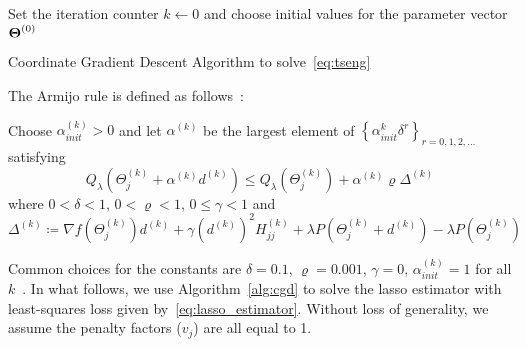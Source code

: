 \begin{algorithm}[htbp]
	\SetAlgoLined
	Set the iteration counter $k \leftarrow 0$ and choose initial values for the parameter vector $\boldsymbol{\Theta}^{(0)}$\;
\caption{Coordinate Gradient Descent Algorithm to solve~\eqref{eq:tseng}} \label{alg:cgd}
\end{algorithm}

\FloatBarrier

The Armijo rule is defined as follows~\citep{tseng2009coordinate}:
\begin{tcolorbox}
	Choose $\alpha_{init}^{(k)}>0$ and let $\alpha^{(k)}$ be the largest element of $\left\lbrace \alpha_{init}^k \delta^r \right\rbrace_{r = 0,1,2,\ldots} $ satisfying
	\begin{equation}
	Q_{\lambda}(\Theta_j^{(k)} + \alpha^{(k)} d^{(k)}) \leq Q_{\lambda} (\Theta_j^{(k)}) + \alpha^{(k)}\varrho \Delta^{(k)}
	\end{equation}
	where $0 < \delta <1$, $0 < \varrho <1$, $0 \leq \gamma < 1$ and
	\begin{equation}
	\Delta^{(k)} \coloneqq \nabla f(\Theta_j^{(k)})d^{(k)} + \gamma (d^{(k)})^2 H^{(k)}_{jj} + \lambda P(\Theta_j^{(k)} + d^{(k)}) - \lambda P(\Theta_j^{(k)})
	\end{equation}
\end{tcolorbox}
Common choices for the constants are $\delta=0.1$, $\varrho=0.001$, $\gamma = 0$, $\alpha_{init}^{(k)} = 1$ for all $k$~\citep{bertsekas1999nonlinear}.
In what follows, we use Algorithm~\ref{alg:cgd} to solve the lasso estimator with least-squares loss given by~\eqref{eq:lasso_estimator}. Without loss of generality, we assume the penalty factors ($v_j$) are all equal to 1. 


